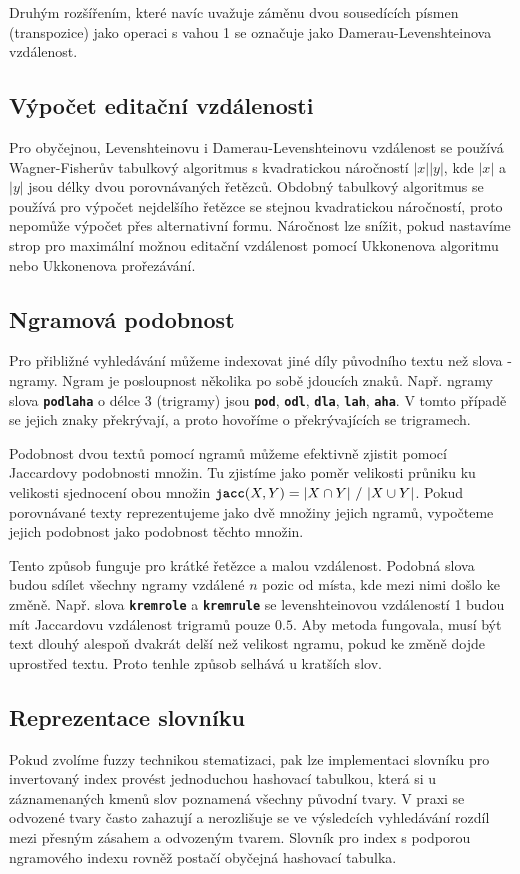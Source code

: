\documentclass[11pt,letterpaper,oneside,openright]{book}
\newcommand{\bftt}[1]{\texttt{\textbf{#1}}}
\begin{document}
Druhým rozšířením, které navíc uvažuje záměnu dvou sousedících písmen
(transpozice) jako operaci s vahou 1 se označuje jako Damerau-Levenshteinova
vzdálenost.

\subsection{Výpočet editační vzdálenosti}
Pro obyčejnou, Levenshteinovu i Damerau-Levenshteinovu vzdálenost se používá
Wagner-Fisherův tabulkový algoritmus s kvadratickou náročností $|x||y|$, kde
$|x|$ a $|y|$ jsou délky dvou porovnávaných řetězců. Obdobný tabulkový
algoritmus se používá pro výpočet nejdelšího řetězce se stejnou kvadratickou
náročností, proto nepomůže výpočet přes alternativní formu. Náročnost lze
snížit, pokud nastavíme strop pro maximální možnou editační vzdálenost pomocí
Ukkonenova algoritmu nebo Ukkonenova prořezávání.



\subsection{Ngramová podobnost}
Pro přibližné vyhledávání můžeme indexovat jiné díly původního textu než slova
- ngramy.  Ngram je posloupnost několika po sobě jdoucích znaků. Např. ngramy
slova \bftt{podlaha} o délce 3 (trigramy) jsou \bftt{pod}, \bftt{odl},
\bftt{dla}, \bftt{lah}, \bftt{aha}. V tomto případě se jejich znaky překrývají,
a proto hovoříme o překrývajících se trigramech.

Podobnost dvou textů pomocí ngramů můžeme efektivně zjistit pomocí Jaccardovy
podobnosti množin. Tu zjistíme jako poměr velikosti průniku ku velikosti
sjednocení obou množin $\bftt{jacc}(X, Y) = |X \cap Y|\ /\ |X \cup Y|$. Pokud
porovnávané texty reprezentujeme jako dvě množiny jejich ngramů, vypočteme
jejich podobnost jako podobnost těchto množin.

Tento způsob funguje pro krátké řetězce a malou vzdálenost. Podobná slova budou
sdílet všechny ngramy vzdálené $n$ pozic od místa, kde mezi nimi došlo ke
změně. Např. slova \bftt{kremrole} a \bftt{kremrule} se levenshteinovou
vzdáleností 1 budou mít Jaccardovu vzdálenost trigramů pouze $0.5$. Aby metoda
fungovala, musí být text dlouhý alespoň dvakrát delší než velikost ngramu,
pokud ke změně dojde uprostřed textu. Proto tenhle způsob selhává u kratších
slov.

\subsection{Reprezentace slovníku}
Pokud zvolíme fuzzy technikou stematizaci, pak lze implementaci slovníku pro
invertovaný index provést jednoduchou hashovací tabulkou, která si u
záznamenaných kmenů slov poznamená všechny původní tvary. V praxi se odvozené
tvary často zahazují a nerozlišuje se ve výsledcích vyhledávání rozdíl mezi
přesným zásahem a odvozeným tvarem. Slovník pro index s podporou ngramového
indexu rovněž postačí obyčejná hashovací tabulka.
\end{document}
